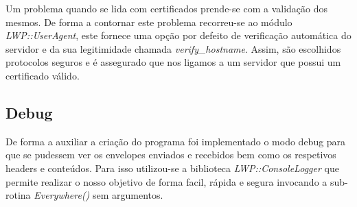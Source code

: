 Um problema quando se lida com certificados prende-se com a validação dos mesmos. De forma a contornar este problema recorreu-se ao módulo \textit{LWP::UserAgent}\cite{lwpUserAgent}, este fornece uma opção por defeito de verificação automática do servidor e da sua legitimidade chamada \textit{verify\_hostname}. Assim, são escolhidos protocolos seguros e é assegurado que nos ligamos a um servidor que possui um certificado válido.


\subsection{Debug}

De forma a auxiliar a criação do programa foi implementado o modo debug para que se pudessem ver os envelopes enviados e recebidos bem como os respetivos headers e conteúdos. Para isso utilizou-se a biblioteca \textit{LWP::ConsoleLogger}\cite{lwpConsoleLoger} que permite realizar o nosso objetivo de forma facil, rápida e segura invocando a sub-rotina \textit{Everywhere()} sem argumentos.